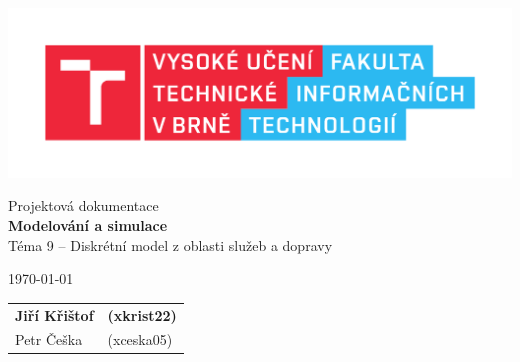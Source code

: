 \documentclass[a4paper, 11pt]{article}
\begin{document}
	\begin{titlepage}
		\begin{center}
			\includegraphics[width=0.77\linewidth]{FIT_logo.pdf} \\


			\Huge{Projektová dokumentace} \\
			\LARGE{\textbf{Modelování a simulace}} \\
			\Large{Téma 9 -- Diskrétní model z oblasti služeb a dopravy}
		\end{center}

		\begin{minipage}{0.65 \textwidth}
			{\Large \today}
		\end{minipage}
		\hfill
		\begin{minipage}[r]{0.35 \textwidth}
			\Large
			\begin{tabular}{l l}
				\textbf{Jiří Křištof} & \textbf{(xkrist22)} \\
				Petr Češka & (xceska05) \\
			\end{tabular}
		\end{minipage}
	\end{titlepage}
\end{document}
